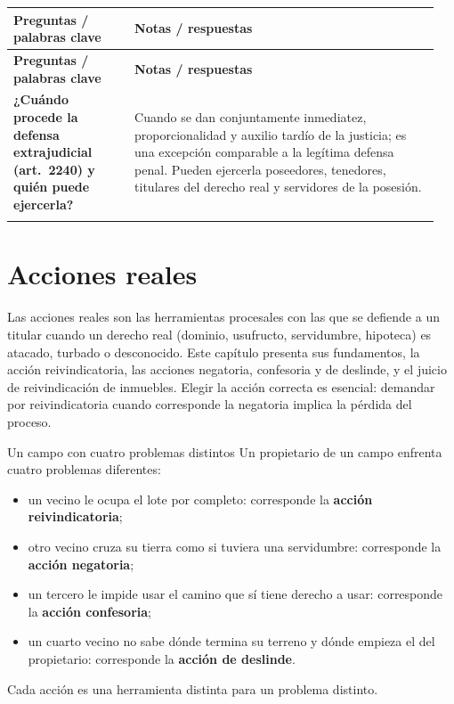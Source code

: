 \documentclass[12pt,oneside]{book}
\makeatletter
\newenvironment{cornell}{%
    \par\vspace{0.5em}
    \noindent
    \begin{longtable}{@{}>{\raggedright\arraybackslash}p{0.27\linewidth}
                         >{\raggedright\arraybackslash}p{0.68\linewidth}@{}}
    \toprule
    \textbf{Preguntas / palabras clave} & \textbf{Notas / respuestas} \\
    \midrule
    \endfirsthead
    \toprule
    \textbf{Preguntas / palabras clave} & \textbf{Notas / respuestas} \\
    \midrule
    \endhead
}{%
    \bottomrule
    \end{longtable}
}
\newcommand{\cornellsummary}[1]{%
    \midrule
    \multicolumn{2}{@{}p{\dimexpr0.95\linewidth+2\tabcolsep\relax}@{}}{%
        \vspace{0.2em}\textbf{Resumen:} #1\vspace{0.2em}} \\
}
\makeatother
\begin{document}
\begin{cornell}
\textbf{¿Cuándo procede la defensa extrajudicial (art.~2240) y quién puede ejercerla?} &
Cuando se dan conjuntamente inmediatez, proporcionalidad y auxilio tardío de la justicia; es una excepción comparable a la legítima defensa penal. Pueden ejercerla poseedores, tenedores, titulares del derecho real y servidores de la posesión. \\

\cornellsummary{Las acciones posesorias son la primera y más veloz línea de defensa de quien, sea o no titular de un derecho real, ve perturbada o extinguida su relación de poder con una cosa. Se justifican en la paz social y en la erradicación de la justicia por mano propia; se tramitan por juicio sumarísimo, su prueba se limita al hecho posesorio y la sentencia es provisoria. La acción de mantener responde a la turbación y la de despojo al desapoderamiento; la defensa privada es una excepción de requisitos estrictos. El derecho real mismo se defiende con las acciones reales.}
\end{cornell}

\chapter{Acciones reales}\label{cap:reales}

Las acciones reales son las herramientas procesales con las que se defiende a un titular cuando un derecho real (dominio, usufructo, servidumbre, hipoteca) es atacado, turbado o desconocido. Este capítulo presenta sus fundamentos, la acción reivindicatoria, las acciones negatoria, confesoria y de deslinde, y el juicio de reivindicación de inmuebles. Elegir la acción correcta es esencial: demandar por reivindicatoria cuando corresponde la negatoria implica la pérdida del proceso.

\begin{example}{Un campo con cuatro problemas distintos}
Un propietario de un campo enfrenta cuatro problemas diferentes:
\begin{itemize}
    \item un vecino le ocupa el lote por completo: corresponde la \textbf{acción reivindicatoria};
    \item otro vecino cruza su tierra como si tuviera una servidumbre: corresponde la \textbf{acción negatoria};
    \item un tercero le impide usar el camino que sí tiene derecho a usar: corresponde la \textbf{acción confesoria};
    \item un cuarto vecino no sabe dónde termina su terreno y dónde empieza el del propietario: corresponde la \textbf{acción de deslinde}.
\end{itemize}
Cada acción es una herramienta distinta para un problema distinto.
\end{example}
\end{document}
